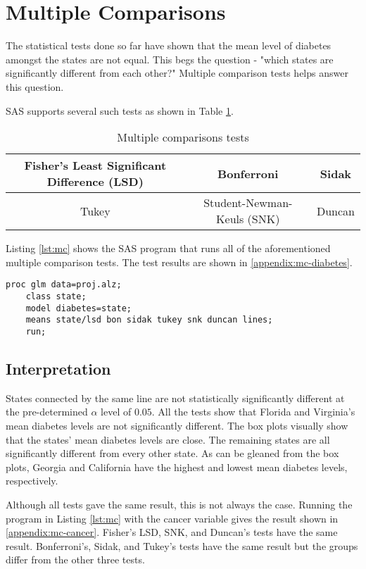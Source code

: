 \documentclass{article}
\begin{document}
\section{Multiple Comparisons}
The statistical tests done so far have shown that the mean level of diabetes amongst the states are not equal. This begs the question - "which states are significantly different from each other?" Multiple comparison tests helps answer this question. 

SAS supports several such tests as shown in Table \ref{tab:mc-tests}.

\begin{table}[ht]
    \centering
    \begin{tabular}{|c|c|c|}
    \hline
        Fisher's Least Significant Difference (LSD) & Bonferroni & Sidak \\
        \hline
         Tukey & Student-Newman-Keuls (SNK) & Duncan \\
         \hline
    \end{tabular}
    \caption{Multiple comparisons tests}
    \label{tab:mc-tests}
\end{table}

Listing \ref{lst:mc} shows the SAS program that runs all of the aforementioned multiple comparison tests. The test results are shown in \ref{appendix:mc-diabetes}.

\begin{lstlisting}[language=SAS,caption=Multiple comparison tests SAS progam,captionpos=b,label=lst:mc]
    proc glm data=proj.alz;
    class state;
    model diabetes=state;
    means state/lsd bon sidak tukey snk duncan lines;
    run;
\end{lstlisting}


\subsection{Interpretation}
States connected by the same line are not statistically significantly different at the pre-determined $\alpha$ level of $0.05$. All the tests show that Florida and Virginia's mean diabetes levels are not significantly different. The box plots visually show that the states' mean diabetes levels are close. The remaining states are all significantly different from every other state. As can be gleaned from the box plots, Georgia and California have the highest and lowest mean diabetes levels, respectively. 

Although all tests gave the same result, this is not always the case. Running the program in Listing \ref{lst:mc} with the cancer variable gives the result shown in \ref{appendix:mc-cancer}. Fisher's LSD, SNK, and Duncan's tests have the same result. Bonferroni's, Sidak, and Tukey's tests have the same result but the groups differ from the other three tests.
\end{document}
